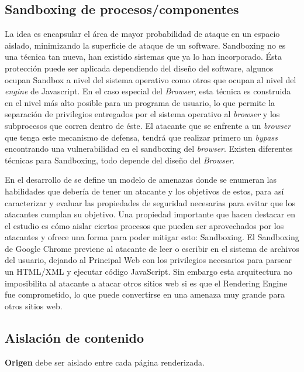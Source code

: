 \subsection{Sandboxing de procesos/componentes}
    \label{chap3:Sandboxing}
    La idea es encapsular el área de mayor probabilidad de ataque en un espacio aislado, minimizando la superficie de ataque de un software. Sandboxing no es una técnica tan nueva, han existido sistemas que ya lo han incorporado. Ésta protección puede ser aplicada dependiendo del diseño del software, algunos ocupan Sandbox a nivel del sistema operativo como otros que ocupan al nivel del \textit{engine} de Javascript. En el caso especial del \textit{Browser}, esta técnica es construida en el nivel más alto posible para un programa de usuario, lo que permite la separación de privilegios entregados por el sistema operativo al \textit{browser} y los subprocesos que corren dentro de éste. El atacante que se enfrente a un \textit{browser} que tenga este mecanismo de defensa, tendrá que realizar primero un \textit{bypass} encontrando una vulnerabilidad en el sandboxing del \textit{browser}. Existen diferentes técnicas para Sandboxing, todo depende del diseño del \textit{Browser}.

    En el desarrollo de \cite{barth2008security} se define un modelo de amenazas donde se enumeran las habilidades que debería de tener un atacante y los objetivos de estos, para así caracterizar y evaluar las propiedades de seguridad necesarias para evitar que los atacantes cumplan su objetivo. Una propiedad importante que hacen destacar en el estudio es cómo aislar ciertos procesos que pueden ser aprovechados por los atacantes y ofrece una forma para poder mitigar esto: Sandboxing. El Sandboxing de Google Chrome previene al atacante de leer o escribir en el sistema de archivos del usuario, dejando al Principal Web con los privilegios necesarios para parsear un HTML/XML y ejecutar código JavaScript. Sin embargo esta arquitectura no imposibilita al atacante a atacar otros sitios web si es que el Rendering Engine fue comprometido, lo que puede convertirse en una amenaza muy grande para otros sitios web.


 \subsection{Aislación de contenido}
 	\textbf{Origen} debe ser aislado entre cada página renderizada.

